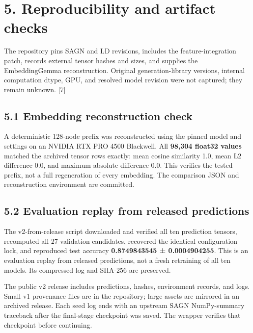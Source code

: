 \documentclass[10pt]{article}
\begin{document}
\section*{5. Reproducibility and artifact checks}

The repository pins SAGN and LD revisions, includes the feature-integration patch, records external tensor hashes and sizes, and supplies the EmbeddingGemma reconstruction. Original generation-library versions, internal computation dtype, GPU, and resolved model revision were not captured; they remain unknown. [7]\par

\subsection*{5.1 Embedding reconstruction check}

A deterministic 128-node prefix was reconstructed using the pinned model and settings on an NVIDIA RTX PRO 4500 Blackwell. All \textbf{98,304 float32 values} matched the archived tensor rows exactly: mean cosine similarity 1.0, mean L2 difference 0.0, and maximum absolute difference 0.0. This verifies the tested prefix, not a full regeneration of every embedding. The comparison JSON and reconstruction environment are committed.\par

\subsection*{5.2 Evaluation replay from released predictions}

The v2-from-release script downloaded and verified all ten prediction tensors, recomputed all 27 validation candidates, recovered the identical configuration lock, and reproduced test accuracy \textbf{0.8749843545 ± 0.0004904255}. This is an evaluation replay from released predictions, not a fresh retraining of all ten models. Its compressed log and SHA-256 are preserved.\par

The public v2 release includes predictions, hashes, environment records, and logs. Small v1 provenance files are in the repository; large assets are mirrored in an archived release. Each seed log ends with an upstream SAGN NumPy-summary traceback after the final-stage checkpoint was saved. The wrapper verifies that checkpoint before continuing.\par

\newpage
\end{document}

